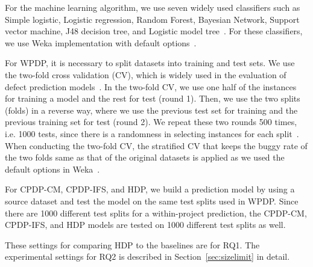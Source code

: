 For the machine learning algorithm, we use seven widely used classifiers such as Simple logistic, Logistic regression, Random Forest, Bayesian Network, Support vector machine, J48 decision tree, and Logistic model tree~\cite{DAmbros12,Ghotra15,Lee11,Lessmann08,Nam13,Song11,Ghotra15}.
For these classifiers, we use Weka implementation with default
options~\cite{Weka}.

For WPDP, it is necessary to split datasets into training and test
sets. We use the two-fold cross validation (CV), which is widely used in the evaluation of
defect prediction models~\cite{Klas2010,Nam13,Pinzger2008}. In the two-fold CV, we use one half of the instances for training a model and the rest for
test (round 1). Then, we use the two splits (folds) in a reverse way, where we
use the previous test set for training and the previous training set for test
(round 2). We repeat these two rounds 500 times, i.e. 1000 tests, since there
is a randomness in selecting instances for each split~\cite{Arcuri11}. When conducting the two-fold CV, the stratified CV that keeps the buggy rate of the two folds same as that of the original datasets is applied as we used the default options in Weka~\cite{Weka}.

For CPDP-CM, CPDP-IFS, and HDP, we build a 
prediction model by using a source dataset and test the model on the same test
splits used in WPDP. Since there are 1000 different test
splits for a within-project prediction, the CPDP-CM, CPDP-IFS, and HDP models
are tested on 1000 different test splits as well.

These settings for comparing HDP to the baselines are for RQ1. The experimental settings for RQ2 is described in Section~\ref{sec:sizelimit} in detail.

